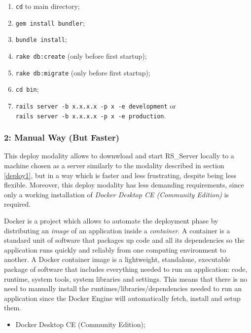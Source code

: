 \documentclass[a4paper, english]{article}
\newcounter{subsubsubsection}[subsubsection]
\begin{document}

\begin{enumerate}
\item \verb|cd| to main directory;
\item \verb|gem install bundler|;
\item \verb|bundle install|;
\item \verb|rake db:create| (only before first startup);
\item \verb|rake db:migrate| (only before first startup);
\item \verb|cd bin|;
\item \verb|rails server -b x.x.x.x -p x -e development| or\\ \verb|rails server -b x.x.x.x -p x -e production|.
\end{enumerate}

\subsubsection{2: Manual Way (But Faster)}

This deploy modality allows to downwload and start RS\_Server locally to a machine chosen as a server similarly to the modality described in section \ref{deploy1}, but in a way which is faster and less frustrating, despite being less flexible. Moreover, this deploy modality has less demanding requirements, since only a working installation of \emph{Docker Desktop CE (Community Edition)} is required.

Docker is a project which allows to automate the deployment phase by distributing an \emph{image} of an application inside a \emph{container}. A container is a standard unit of software that packages up code and all its dependencies so the application runs quickly and reliably from one computing environment to another. A Docker container image is a lightweight, standalone, executable package of software that includes everything needed to run an application: code, runtime, system tools, system libraries and settings. This means that there is no need to manually install the runtimes/libraries/dependencies needed to run an application since the Docker Engine will automatically fetch, install and setup them.


\begin{itemize}
\item Docker Desktop CE (Community Edition);
\end{itemize}
\end{document}
